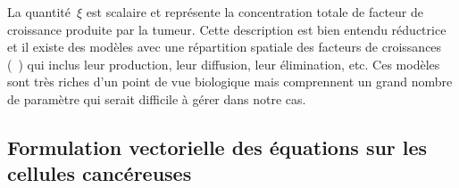 \documentclass[main.tex]{subfiles}
\begin{document}
\bigskip
La quantité~$\xi$ est scalaire et représente la concentration totale de facteur de croissance %
produite par la tumeur. Cette description est bien entendu réductrice et il existe des modèles avec une répartition spatiale des facteurs de croissances (\cf~\cite{Billy2009545}) qui inclus leur production, leur diffusion, leur élimination, etc. Ces modèles sont très riches d'un point de vue biologique mais comprennent un grand nombre de paramètre qui serait difficile à gérer dans notre cas. 

\subsection{Formulation vectorielle des équations sur les cellules cancéreuses}
\end{document}
